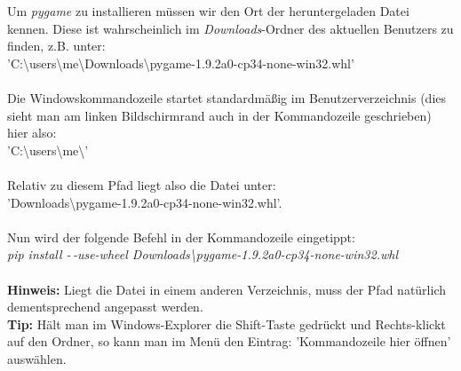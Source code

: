 \documentclass[ngerman,oneside, a4letter]{article}
\begin{document}
\noindent Um \emph{pygame} zu installieren müssen wir den Ort der heruntergeladen Datei kennen. Diese ist wahrscheinlich im \emph{Downloads}-Ordner des aktuellen Benutzers zu finden, z.B. unter:
\\
'C:\textbackslash users\textbackslash me\textbackslash Downloads\textbackslash pygame-1.9.2a0-cp34-none-win32.whl'
\\
\\
Die Windowskommandozeile startet standardmäßig im Benutzerverzeichnis (dies sieht man am linken Bildschirmrand auch in der Kommandozeile geschrieben) hier also:
\\
'C:\textbackslash users\textbackslash me\textbackslash'
\\
\\
Relativ zu diesem Pfad liegt also die Datei unter:
\\'Downloads\textbackslash pygame-1.9.2a0-cp34-none-win32.whl'. 
\\
\\
Nun wird der folgende Befehl in der Kommandozeile eingetippt:
\\
\emph{pip install -\,-use-wheel Downloads\textbackslash pygame-1.9.2a0-cp34-none-win32.whl}
\\
\\
\textbf{Hinweis:} Liegt die Datei in einem anderen Verzeichnis, muss der Pfad natürlich dementsprechend angepasst werden.
\\\textbf{Tip:} Hält man im Windows-Explorer die Shift-Taste gedrückt und Rechts-klickt auf den Ordner, so kann man im Menü den Eintrag: 'Kommandozeile hier öffnen' auswählen.

\begin{center}
\end{center}
\end{document}
